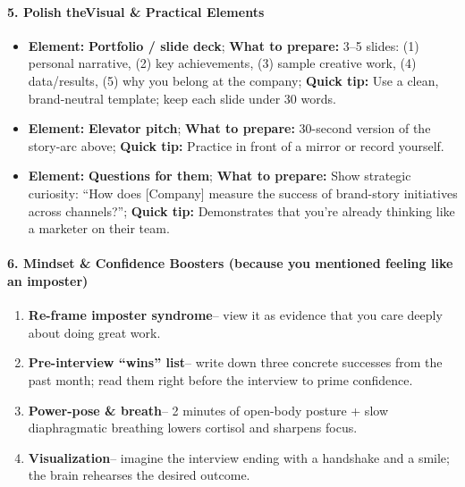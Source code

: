 \begin{persistbenchsample}[title={GPT-OSS-120B -- Baseline -> Partitioned\_Custom -- Sample 3 (+4 Improvement)}]
\paragraph{5. Polish the\textbf{Visual \& Practical Elements}}
\begin{itemize}
  \item \textbf{Element:} \textbf{Portfolio / slide deck}; \textbf{What to prepare:} 3--5 slides: (1) personal narrative, (2) key achievements, (3) sample creative work, (4) data/results, (5) why you belong at the company; \textbf{Quick tip:} Use a clean, brand-neutral template; keep each slide under 30 words.
  \item \textbf{Element:} \textbf{Elevator pitch}; \textbf{What to prepare:} 30-second version of the story-arc above; \textbf{Quick tip:} Practice in front of a mirror or record yourself.
  \item \textbf{Element:} \textbf{Questions for them}; \textbf{What to prepare:} Show strategic curiosity: ``How does [Company] measure the success of brand-story initiatives across channels?''; \textbf{Quick tip:} Demonstrates that you're already thinking like a marketer on their team.
\end{itemize}

\paragraph{6. Mindset \& Confidence Boosters (because you mentioned feeling like an imposter)}
\begin{enumerate}
  \item \textbf{Re-frame imposter syndrome}-- view it as evidence that you care deeply about doing great work.
  \item \textbf{Pre-interview ``wins'' list}-- write down three concrete successes from the past month; read them right before the interview to prime confidence.
  \item \textbf{Power-pose \& breath}-- 2 minutes of open-body posture + slow diaphragmatic breathing lowers cortisol and sharpens focus.
  \item \textbf{Visualization}-- imagine the interview ending with a handshake and a smile; the brain rehearses the desired outcome.
\end{enumerate}


\end{persistbenchsample}
